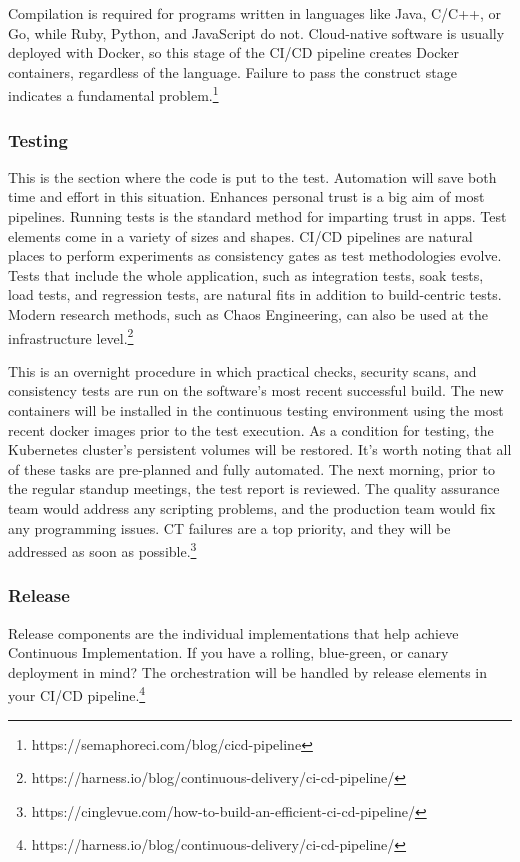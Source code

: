Compilation is required for programs written in languages like Java, C/C++, or Go, while Ruby, Python, and JavaScript do not. Cloud-native software is usually deployed with Docker, so this stage of the CI/CD pipeline creates Docker containers, regardless of the language. Failure to pass the construct stage indicates a fundamental problem.\footnote{https://semaphoreci.com/blog/cicd-pipeline}


\subsubsection{Testing}


This is the section where the code is put to the test. Automation will save both time and effort in this situation. Enhances personal trust is a big aim of most pipelines. Running tests is the standard method for imparting trust in apps. Test elements come in a variety of sizes and shapes. CI/CD pipelines are natural places to perform experiments as consistency gates as test methodologies evolve. Tests that include the whole application, such as integration tests, soak tests, load tests, and regression tests, are natural fits in addition to build-centric tests. Modern research methods, such as Chaos Engineering, can also be used at the infrastructure level.\footnote{https://harness.io/blog/continuous-delivery/ci-cd-pipeline/}

This is an overnight procedure in which practical checks, security scans, and consistency tests are run on the software's most recent successful build. The new containers will be installed in the continuous testing environment using the most recent docker images prior to the test execution. As a condition for testing, the Kubernetes cluster's persistent volumes will be restored. It's worth noting that all of these tasks are pre-planned and fully automated. The next morning, prior to the regular standup meetings, the test report is reviewed. The quality assurance team would address any scripting problems, and the production team would fix any programming issues. CT failures are a top priority, and they will be addressed as soon as possible.\footnote{https://cinglevue.com/how-to-build-an-efficient-ci-cd-pipeline/}

\subsubsection{Release}


Release components are the individual implementations that help achieve Continuous Implementation. If you have a rolling, blue-green, or canary deployment in mind? The orchestration will be handled by release elements in your CI/CD pipeline.\footnote{https://harness.io/blog/continuous-delivery/ci-cd-pipeline/}

